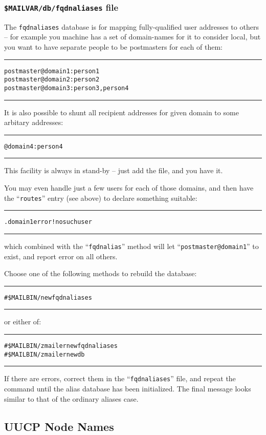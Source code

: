 \subsubsection{{\tt \$MAILVAR/db/fqdnaliases} file}

The {\tt fqdnaliases} database is for mapping fully-qualified user
addresses to others -- for example you machine has a set of
domain-names for it to consider local, but you want to have
separate people to be postmasters for each of them:
\begin{alltt}\medskip\hrule\medskip
postmaster@domain1: person1
postmaster@domain2: person2
postmaster@domain3: person3, person4
\medskip\hrule\medskip\end{alltt}

It is also possible to shunt all recipient addresses for given domain
to some arbitary addresses:
\begin{alltt}\medskip\hrule\medskip
@domain4:  person4
\medskip\hrule\medskip\end{alltt}

This facility is always in stand-by -- just add the file, and
you have it.

You may even handle just a few users for each of those domains, and then
have the ``{\tt routes}'' entry (see above) to declare something suitable:
\begin{alltt}\medskip\hrule\medskip
.domain1  error!nosuchuser
\medskip\hrule\medskip\end{alltt}

which combined with the ``{\tt fqdnalias}'' method will let
``{\tt postmaster@domain1}'' to exist, and report error on all others.

Choose one of the following methods to rebuild the database:
\begin{alltt}\medskip\hrule\medskip
# \$MAILBIN/newfqdnaliases
\medskip\hrule\medskip\end{alltt}
or either of:
\begin{alltt}\medskip\hrule\medskip
# \$MAILBIN/zmailer newfqdnaliases
# \$MAILBIN/zmailer newdb
\medskip\hrule\medskip\end{alltt}

If there are errors, correct them in the ``{\tt fqdnaliases}'' file,
and repeat the command until the alias database has been initialized.
The final message looks similar to that of the ordinary aliases case.


\subsection{UUCP Node Names}

